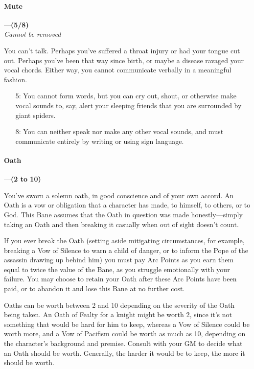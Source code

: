 \documentclass[oneside,11pt,english]{book}
\begin{document}
\paragraph{\label{bane:Mute}Mute}---\quad\textbf{(5/8) }\\
\emph{Cannot be removed}\par
You can't talk. Perhaps you've suffered a throat injury or had your tongue cut out. Perhaps you've been 
that way since birth, or maybe a disease ravaged your vocal chords. Either way, you cannot communicate verbally in a meaningful fashion.
\begin{itemize}
\item [5:] You cannot form words, but you can cry out, shout, or otherwise make vocal sounds to, say, alert your sleeping friends that you are surrounded by giant spiders.
\item [8:] You can neither speak nor make any other vocal sounds, and must communicate entirely by writing or using sign language.
\end{itemize}
\paragraph{\label{bane:Oath}Oath}---\quad\textbf{(2 to 10) }\par
You've sworn a solemn oath, in good conscience and of your own accord. An Oath is a vow or obligation 
that a character has made, to himself, to others, or to God. This Bane assumes that the Oath in question 
was made honestly—simply taking an Oath and then breaking it casually when out of sight doesn't count. 


If you ever break the Oath (setting aside mitigating circumstances, for example, breaking a Vow of 
Silence to warn a child of danger, or to inform the Pope of the assassin drawing up behind him) you must 
pay Arc Points as you earn them equal to twice the value of the Bane, as you struggle emotionally with 
your failure. You may choose to retain your Oath after these Arc Points have been paid, or to abandon it 
and lose this Bane at no further cost. 


Oaths can be worth between 2 and 10 depending on the severity of the Oath being taken. An Oath of 
Fealty for a knight might be worth 2, since it's not something that would be hard for him to keep, whereas 
a Vow of Silence could be worth more, and a Vow of Pacifism could be worth as much as 10, depending 
on the character's background and premise. Consult with your GM to decide what an Oath should be 
worth. Generally, the harder it would be to keep, the more it should be worth. 
\end{document}
